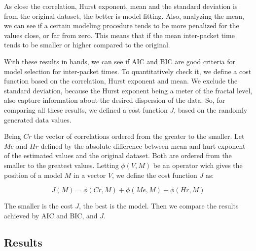 As close the correlation, Hurst exponent, mean and the standard deviation is from the original dataset, the better is model fitting. Also, analyzing the mean, we can see if a certain modeling procedure tends to be more penalized for the values close, or far from zero. This means that if the mean inter-packet time tends to be smaller or higher compared to the original. 

With these results in hands, we can see if AIC and BIC are good criteria for model selection for inter-packet times. To quantitatively check it, we define a cost function based on the correlation, Hurst exponent and mean. We exclude the standard deviation, because the Hurst exponent being a meter of the fractal level, also capture information about the desired dispersion of the data. So, for comparing all these results, we defined a cost function $J$, based on the randomly generated data values.

Being $Cr$ the vector of correlations ordered from the greater to the smaller. Let $Me$ and $Hr$ defined by the absolute difference between mean and hurt exponent of the estimated values and the original dataset. Both are ordered from the smaller to the greatest values. Letting $\phi(V, M)$ be an operator wich gives the position of a model $M$ in a vector $V$, we define the cost function $J$ as:


\begin{equation}
J(M) = \phi(Cr, M) + \phi(Me, M) + \phi(Hr, M)
\end{equation}

The smaller is the cost $J$, the best is the model. Then we compare the results achieved by AIC and BIC, and $J$.

\subsection{Results}



